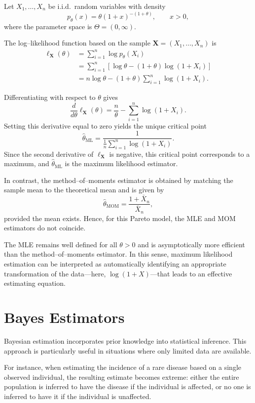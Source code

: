 \begin{ex}
Let \(X_1,\dots,X_n\) be i.i.d.\ random variables with density
\[
    p_\theta(x) = \theta (1+x)^{-(1+\theta)}, \qquad x>0,
\]
where the parameter space is \(\Theta=(0,\infty)\).

The log--likelihood function based on the sample
\(\mathbf{X}=(X_1,\dots,X_n)\) is
\begin{align*}
    \ell_{\mathbf{X}}(\theta)
    &= \sum_{i=1}^n \log p_\theta(X_i) \\
    &= \sum_{i=1}^n
       \left[ \log\theta - (1+\theta)\log(1+X_i) \right] \\
    &= n\log\theta
       - (1+\theta)\sum_{i=1}^n \log(1+X_i).
\end{align*}

Differentiating with respect to \(\theta\) gives
\[
    \frac{d}{d\theta}\ell_{\mathbf{X}}(\theta)
    = \frac{n}{\theta}
      - \sum_{i=1}^n \log(1+X_i).
\]
Setting this derivative equal to zero yields the unique critical point
\[
    \hat\theta_{\mathrm{ML}}
    = \frac{1}{\frac{1}{n}\sum_{i=1}^n \log(1+X_i)}.
\]
Since the second derivative of \(\ell_{\mathbf{X}}\) is negative, this
critical point corresponds to a maximum, and
\(\hat\theta_{\mathrm{ML}}\) is the maximum likelihood estimator.

In contrast, the method--of--moments estimator is obtained by matching
the sample mean to the theoretical mean and is given by
\[
    \hat\theta_{\mathrm{MOM}} = \frac{1+\bar X_n}{\bar X_n},
\]
provided the mean exists. Hence, for this Pareto model, the MLE and MOM
estimators do not coincide.

The MLE remains well defined for all \(\theta>0\) and is asymptotically
more efficient than the method--of--moments estimator. In this sense,
maximum likelihood estimation can be interpreted as automatically
identifying an appropriate transformation of the data—here,
\(\log(1+X)\)—that leads to an effective estimating equation.
\end{ex}


\section{Bayes Estimators}%
\label{sec:Bayes Estimators}
Bayesian estimation incorporates prior knowledge into statistical inference. 
This approach is particularly useful in situations where only limited data are available. 

For instance, when estimating the incidence of a rare disease based on a single observed individual, the resulting estimate becomes extreme: either the entire population is inferred to have the disease if the individual is affected, or no one is inferred to have it if the individual is unaffected.

